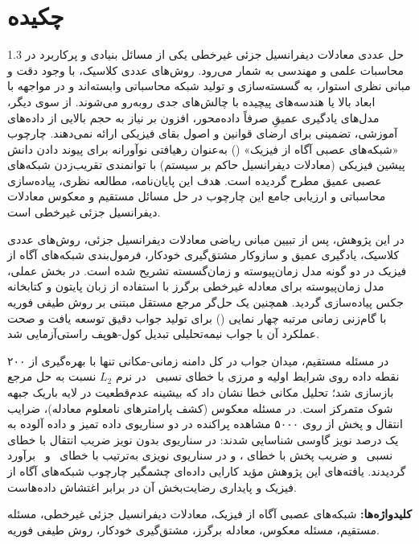 \chapter*{چکیده}
{}

\begin{spacing}{1.3}
حل عددی معادلات دیفرانسیل جزئی غیرخطی یکی از مسائل بنیادی و پرکاربرد در محاسبات علمی و مهندسی به شمار می‌رود. روش‌های عددی کلاسیک، با وجود دقت و مبانی نظری استوار، به گسسته‌سازی و تولید شبکه محاسباتی وابسته‌اند و در مواجهه با ابعاد بالا یا هندسه‌های پیچیده با چالش‌های جدی روبه‌رو می‌شوند. از سوی دیگر، مدل‌های یادگیری عمیقِ صرفاً داده‌محور، افزون بر نیاز به حجم بالایی از داده‌های آموزشی، تضمینی برای ارضای قوانین و اصول بقای فیزیکی ارائه نمی‌دهند. چارچوب «شبکه‌های عصبی آگاه از فیزیک» () به‌عنوان رهیافتی نوآورانه برای پیوند دادن دانش پیشین فیزیکی (معادلات دیفرانسیل حاکم بر سیستم) با توانمندی تقریب‌زدن شبکه‌های عصبی عمیق مطرح گردیده است. هدف این پایان‌نامه، مطالعه نظری، پیاده‌سازی محاسباتی و ارزیابی جامع این چارچوب در حل مسائل مستقیم و معکوس معادلات دیفرانسیل جزئی غیرخطی است.

در این پژوهش، پس از تبیین مبانی ریاضی معادلات دیفرانسیل جزئی، روش‌های عددی کلاسیک، یادگیری عمیق و سازوکار مشتق‌گیری خودکار، فرمول‌بندی شبکه‌های آگاه از فیزیک در دو گونه مدل زمان‌پیوسته و زمان‌گسسته تشریح شده است. در بخش عملی، مدل زمان‌پیوسته برای معادله غیرخطی برگرز با استفاده از زبان پایتون و کتابخانه جکس پیاده‌سازی گردید. همچنین یک حل‌گر مرجع مستقل مبتنی بر روش طیفی فوریه با گام‌زنی زمانی مرتبه چهار نمایی () برای تولید جواب دقیق توسعه یافت و صحت عملکرد آن با جواب نیمه‌تحلیلی تبدیل کول-هوپف راستی‌آزمایی شد.

در مسئله مستقیم، میدان جواب در کل دامنه زمانی-مکانی تنها با بهره‌گیری از ۲۰۰ نقطه داده روی شرایط اولیه و مرزی با خطای نسبی \FwdRelErr\ در نرم $L_2$ نسبت به حل مرجع بازسازی شد؛ تحلیل مکانی خطا نشان داد که بیشینه عدم‌قطعیت در لایه باریک جبهه شوک متمرکز است. در مسئله معکوس (کشف پارامترهای نامعلوم معادله)، ضرایب انتقال و پخش از روی ۵۰۰۰ مشاهده پراکنده در دو سناریوی داده تمیز و داده آلوده به یک درصد نویز گاوسی شناسایی شدند: در سناریوی بدون نویز ضریب انتقال با خطای نسبی \LamIErrClean\ و ضریب پخش با خطای \LamIIErrClean، و در سناریوی نویزی به‌ترتیب با خطای \LamIErrNoisy\ و \LamIIErrNoisy\ برآورد گردیدند. یافته‌های این پژوهش مؤید کارایی داده‌ای چشمگیر چارچوب شبکه‌های آگاه از فیزیک و پایداری رضایت‌بخش آن در برابر اغتشاش داده‌هاست.

\vspace{0.4cm}
\noindent\textbf{کلیدواژه‌ها:} شبکه‌های عصبی آگاه از فیزیک، معادلات دیفرانسیل جزئی غیرخطی، مسئله مستقیم، مسئله معکوس، معادله برگرز، مشتق‌گیری خودکار، روش طیفی فوریه.
\end{spacing}
